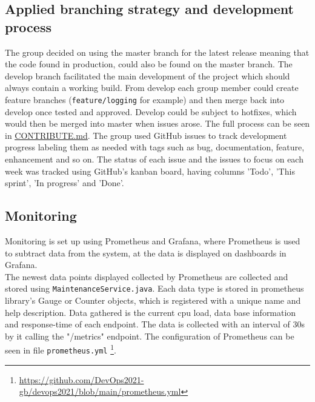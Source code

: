 
\subsection{Applied branching strategy and development process} %
The group decided on using the master branch for the latest release meaning that the code found in production, could also be found on the master branch. The develop branch facilitated the main development of the project which should always contain a working build. From develop each group member could create feature branches (\texttt{feature/logging} for example) and then merge back into develop once tested and approved. Develop could be subject to hotfixes, which would then be merged into master when issues arose. The full process can be seen in \underline{\href{https://github.com/DevOps2021-gb/devops2021/blob/main/CONTRIBUTE.md}{CONTRIBUTE.md}}. The group used GitHub issues to track development progress labeling them as needed with tags such as bug, documentation, feature, enhancement and so on. The status of each issue and the issues to focus on each week was tracked using GitHub's kanban board, having columns 'Todo', 'This sprint', 'In progress' and 'Done'.

\subsection{Monitoring} %
\label{subsection:monitoring}
Monitoring is set up using Prometheus and Grafana, where Prometheus is used to subtract data from the system, at the data is displayed on dashboards in Grafana.\\
The newest data points displayed collected by Prometheus are collected and stored using \texttt{MaintenanceService.java}. Each data type is stored in prometheus library's Gauge or Counter objects, which is registered with a unique name and help description. Data gathered is the current cpu load, data base information and response-time of each endpoint. The data is collected with an interval of 30s by it calling the "/metrics" endpoint. The configuration of Prometheus can be seen in file \texttt{prometheus.yml} \footnote{\url{https://github.com/DevOps2021-gb/devops2021/blob/main/prometheus.yml}}.

